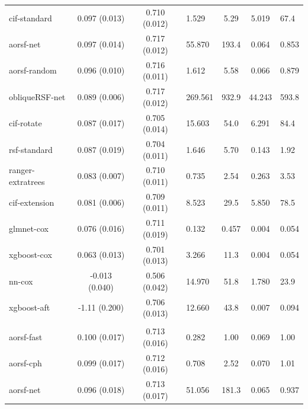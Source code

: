 \documentclass[twoside,11pt]{article}\usepackage[]{graphicx}\usepackage[]{xcolor}
\newenvironment{knitrout}{}{} %
\begin{document}
\begin{knitrout}
\begin{longtable}{lcclccl}
\hspace{1em}cif-standard & 0.097 (0.013) & 0.710 (0.012) & 1.529 & 5.29 & 5.019 & 67.4\\
\hspace{1em}aorsf-net & 0.097 (0.014) & 0.717 (0.012) & 55.870 & 193.4 & 0.064 & 0.853\\
\hspace{1em}aorsf-random & 0.096 (0.010) & 0.716 (0.011) & 1.612 & 5.58 & 0.066 & 0.879\\
\hspace{1em}obliqueRSF-net & 0.089 (0.006) & 0.717 (0.012) & 269.561 & 932.9 & 44.243 & 593.8\\
\hspace{1em}cif-rotate & 0.087 (0.017) & 0.705 (0.014) & 15.603 & 54.0 & 6.291 & 84.4\\
\hspace{1em}rsf-standard & 0.087 (0.019) & 0.704 (0.011) & 1.646 & 5.70 & 0.143 & 1.92\\
\hspace{1em}ranger-extratrees & 0.083 (0.007) & 0.710 (0.011) & 0.735 & 2.54 & 0.263 & 3.53\\
\hspace{1em}cif-extension & 0.081 (0.006) & 0.709 (0.011) & 8.523 & 29.5 & 5.850 & 78.5\\
\hspace{1em}glmnet-cox & 0.076 (0.016) & 0.711 (0.019) & 0.132 & 0.457 & 0.004 & 0.054\\
\hspace{1em}xgboost-cox & 0.063 (0.013) & 0.701 (0.013) & 3.266 & 11.3 & 0.004 & 0.054\\
\hspace{1em}nn-cox & -0.013 (0.040) & 0.506 (0.042) & 14.970 & 51.8 & 1.780 & 23.9\\
\hspace{1em}xgboost-aft & -1.11 (0.200) & 0.706 (0.013) & 12.660 & 43.8 & 0.007 & 0.094\\
\addlinespace[0.3em]
\hline
\multicolumn{7}{l}{\textit{\textbf{Colon cancer; recurrence, n = 929, p = 12}}}\\
\hline
\hspace{1em}aorsf-fast & 0.100 (0.017) & 0.713 (0.016) & 0.282 & 1.00 & 0.069 & 1.00\\
\hspace{1em}aorsf-cph & 0.099 (0.017) & 0.712 (0.016) & 0.708 & 2.52 & 0.070 & 1.01\\
\hspace{1em}aorsf-net & 0.096 (0.018) & 0.713 (0.017) & 51.056 & 181.3 & 0.065 & 0.937\\

\end{longtable}
\end{knitrout}
\end{document}
